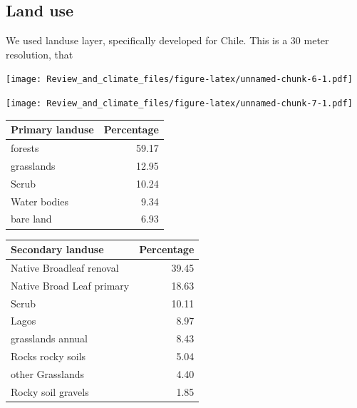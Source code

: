 \documentclass[]{article}
\begin{document}
\hypertarget{land-use}{%
\subsection{Land use}\label{land-use}}

We used \citet{zhao2016detailed} landuse layer, specifically developed for Chile. This is a 30 meter resolution, that

\texttt{[image: Review\_and\_climate\_files/figure-latex/unnamed-chunk-6-1.pdf]}

\texttt{[image: Review\_and\_climate\_files/figure-latex/unnamed-chunk-7-1.pdf]}

\begin{table}[H]
\centering
\begin{tabular}{lr}
\toprule
Primary landuse & Percentage\\
\midrule
forests & 59.17\\
grasslands & 12.95\\
Scrub & 10.24\\
Water bodies & 9.34\\
bare land & 6.93\\
\bottomrule
\end{tabular}
\end{table}

\begin{table}[H]
\centering
\begin{tabular}{lr}
\toprule
Secondary landuse & Percentage\\
\midrule
Native Broadleaf renoval & 39.45\\
Native Broad Leaf primary & 18.63\\
Scrub & 10.11\\
Lagos & 8.97\\
grasslands annual & 8.43\\
\addlinespace
Rocks rocky soils & 5.04\\
other Grasslands & 4.40\\
Rocky soil gravels & 1.85\\
\bottomrule
\end{tabular}
\end{table}

\renewcommand\refname{References}

\end{document}

